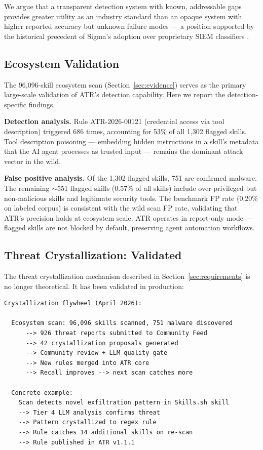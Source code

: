 \documentclass[11pt,letterpaper]{article}
\begin{document}
We argue that a transparent detection system with known, addressable gaps provides greater utility as an industry standard than an opaque system with higher reported accuracy but unknown failure modes --- a position supported by the historical precedent of Sigma's adoption over proprietary SIEM classifiers \cite{sigma}.


\subsection{Ecosystem Validation}

The 96,096-skill ecosystem scan (Section~\ref{sec:evidence}) serves as the primary large-scale validation of ATR's detection capability. Here we report the detection-specific findings.

\textbf{Detection analysis.} Rule ATR-2026-00121 (credential access via tool description) triggered 686 times, accounting for 53\% of all 1,302 flagged skills. Tool description poisoning --- embedding hidden instructions in a skill's metadata that the AI agent processes as trusted input --- remains the dominant attack vector in the wild.

\textbf{False positive analysis.} Of the 1,302 flagged skills, 751 are confirmed malware. The remaining $\sim$551 flagged skills (0.57\% of all skills) include over-privileged but non-malicious skills and legitimate security tools. The benchmark FP rate (0.20\% on labeled corpus) is consistent with the wild scan FP rate, validating that ATR's precision holds at ecosystem scale. ATR operates in report-only mode --- flagged skills are not blocked by default, preserving agent automation workflows.


\subsection{Threat Crystallization: Validated}

The threat crystallization mechanism described in Section~\ref{sec:requirements} is no longer theoretical. It has been validated in production:

\begin{lstlisting}
Crystallization flywheel (April 2026):

  Ecosystem scan: 96,096 skills scanned, 751 malware discovered
      --> 926 threat reports submitted to Community Feed
      --> 42 crystallization proposals generated
      --> Community review + LLM quality gate
      --> New rules merged into ATR core
      --> Recall improves --> next scan catches more

  Concrete example:
    Scan detects novel exfiltration pattern in Skills.sh skill
    --> Tier 4 LLM analysis confirms threat
    --> Pattern crystallized to regex rule
    --> Rule catches 14 additional skills on re-scan
    --> Rule published in ATR v1.1.1
\end{lstlisting}
\end{document}
